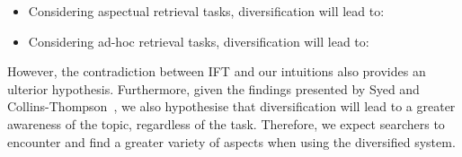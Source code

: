 \begin{itemize}
\item Considering aspectual retrieval tasks, diversification will lead to:

\vspace*{1.5mm}

\item Considering ad-hoc retrieval tasks, diversification will lead to:
\end{itemize}

However, the contradiction between IFT and our intuitions also provides an ulterior hypothesis. Furthermore, given the findings presented by Syed and Collins-Thompson~\cite{syed2017sal}, we also hypothesise that diversification will lead to a greater awareness of the topic, regardless of the task. Therefore, we expect searchers to encounter and find a greater variety of aspects when using the diversified system.






